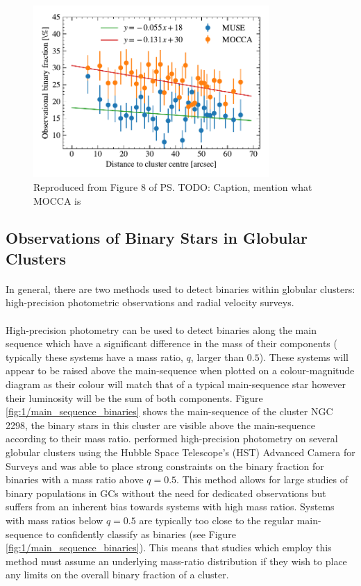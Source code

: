 \begin{figure}
	\centering
	\includegraphics[width=0.8\textwidth]{figures/radial_binarity.pdf}
	\caption{Reproduced from Figure 8 of \citet{Giesers2019} \ps{TODO: Caption, mention what MOCCA is}}
	\label{fig:1/radial_binary_fraction}
\end{figure}

\subsection{Observations of Binary Stars in Globular Clusters}

\paragraph{}
In general, there are two methods used to detect binaries within globular clusters: high-precision
photometric observations and radial velocity surveys.

\paragraph{}
High-precision photometry can be used to detect binaries along the main sequence which have a
significant difference in the mass of their components ( typically these systems have a mass ratio,
$q$, larger than $0.5$). These systems will appear to be raised above the main-sequence when plotted
on a colour-magnitude diagram as their colour will match that of a typical main-sequence star
however their luminosity will be the sum of both components. Figure
\ref{fig:1/main_sequence_binaries} shows the main-sequence of the cluster NGC 2298, the binary stars
in this cluster are visible above the main-sequence according to their mass ratio.
\citet{Milone2012} performed high-precision photometry on several globular clusters using the Hubble
Space Telescope's (HST) Advanced Camera for Surveys and was able to place strong constraints on the
binary fraction for binaries with a mass ratio above $q=0.5$. This method allows for large studies
of binary populations in GCs without the need for dedicated observations but suffers from an
inherent bias towards systems with high mass ratios. Systems with mass ratios below $q=0.5$ are
typically too close to the regular main-sequence to confidently classify as binaries (see Figure
\ref{fig:1/main_sequence_binaries}). This means that studies which employ this method must assume an
underlying mass-ratio distribution if they wish to place any limits on the overall binary fraction
of a cluster.


